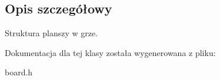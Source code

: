 \subsection{Opis szczegółowy}
Struktura planszy w grze. 

Dokumentacja dla tej klasy została wygenerowana z pliku\+:\begin{DoxyCompactItemize}
\item 
board.\+h\end{DoxyCompactItemize}
